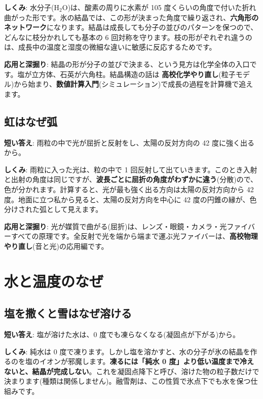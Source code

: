 \documentclass{article}
\begin{document}
\textbf{しくみ}: 水分子(H\(_{2}\)O)は、酸素の周りに水素が 105 度くらいの角度で付いた折れ曲がった形です。氷の結晶では、この形が決まった角度で繰り返され、\textbf{六角形のネットワーク}になります。結晶は成長しても分子の並びのパターンを保つので、どんなに枝分かれしても基本の 6 回対称を守ります。枝の形がぞれぞれ違うのは、成長中の温度と湿度の微細な違いに敏感に反応するためです。

\textbf{応用と深掘り}: 結晶の形が分子の並びで決まる、という見方は化学全体の入口です。塩が立方体、石英が六角柱。結晶構造の話は \textbf{高校化学やり直し}(粒子モデル)から始まり、\textbf{数値計算入門}(シミュレーション)で成長の過程を計算機で追えます。

\subsection{虹はなぜ弧}

\textbf{短い答え}: 雨粒の中で光が屈折と反射をし、太陽の反対方向の 42 度に強く出るから。

\textbf{しくみ}: 雨粒に入った光は、粒の中で 1 回反射して出ていきます。このとき入射と出射の角度は同じですが、\textbf{波長ごとに屈折の角度がわずかに違う}(分散)ので、色が分かれます。計算すると、光が最も強く出る方向は太陽の反対方向から 42 度。地面に立つ私から見ると、太陽の反対方向を中心に 42 度の円錐の縁が、色分けされた弧として見えます。

\textbf{応用と深掘り}: 光が媒質で曲がる(屈折)は、レンズ・眼鏡・カメラ・光ファイバーすべての原理です。全反射で光を端から端まで運ぶ光ファイバーは、\textbf{高校物理やり直し}(音と光)の応用編です。

\section{水と温度のなぜ}

\subsection{塩を撒くと雪はなぜ溶ける}

\textbf{短い答え}: 塩が溶けた水は、0 度でも凍らなくなる(凝固点が下がる)から。

\textbf{しくみ}: 純水は 0 度で凍ります。しかし塩を溶かすと、水の分子が氷の結晶を作るのを塩のイオンが邪魔します。\textbf{凍るには「純水 0 度」より低い温度まで冷えないと、結晶が完成しない}。これを凝固点降下と呼び、溶けた物の粒子数だけで決まります(種類は関係しません)。融雪剤は、この性質で氷点下でも水を保つ仕組みです。
\end{document}
